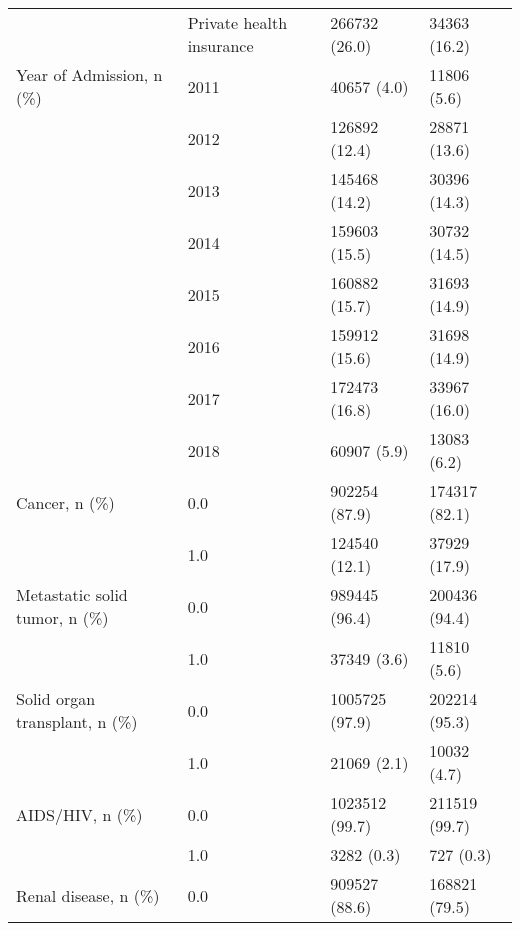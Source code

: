 \begin{tabular}{llll}
                                       & Private health insurance &                         266732 (26.0) &      34363 (16.2) \\
Year of Admission, n (\%) & 2011 &                           40657 (4.0) &       11806 (5.6) \\
                                       & 2012 &                         126892 (12.4) &      28871 (13.6) \\
                                       & 2013 &                         145468 (14.2) &      30396 (14.3) \\
                                       & 2014 &                         159603 (15.5) &      30732 (14.5) \\
                                       & 2015 &                         160882 (15.7) &      31693 (14.9) \\
                                       & 2016 &                         159912 (15.6) &      31698 (14.9) \\
                                       & 2017 &                         172473 (16.8) &      33967 (16.0) \\
                                       & 2018 &                           60907 (5.9) &       13083 (6.2) \\
Cancer, n (\%) & 0.0 &                         902254 (87.9) &     174317 (82.1) \\
                                       & 1.0 &                         124540 (12.1) &      37929 (17.9) \\
Metastatic solid tumor, n (\%) & 0.0 &                         989445 (96.4) &     200436 (94.4) \\
                                       & 1.0 &                           37349 (3.6) &       11810 (5.6) \\
Solid organ transplant, n (\%) & 0.0 &                        1005725 (97.9) &     202214 (95.3) \\
                                       & 1.0 &                           21069 (2.1) &       10032 (4.7) \\
AIDS/HIV, n (\%) & 0.0 &                        1023512 (99.7) &     211519 (99.7) \\
                                       & 1.0 &                            3282 (0.3) &         727 (0.3) \\
Renal disease, n (\%) & 0.0 &                         909527 (88.6) &     168821 (79.5) \\

\end{tabular}
